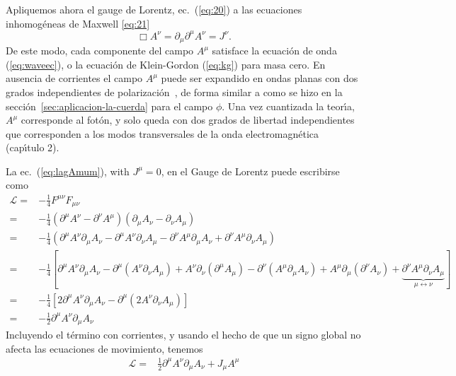 \begin{frame}
Apliquemos ahora el gauge de Lorentz, ec.~(\ref{eq:20}) a las
ecuaciones inhomog\'eneas de Maxwell \eqref{eq:21}
\begin{equation}
  \label{eq:22} 
  \Box A^\nu=\partial_\mu\partial^\mu A^\nu=J^\nu.
\end{equation}
De este modo, cada componente del campo $A^\mu$ satisface la ecuaci\'on de
onda (\ref{eq:waveec}), o la ecuaci\'on de Klein-Gordon (\ref{eq:kg})
para masa cero. En ausencia de corrientes el campo $A^\mu$ puede ser
expandido en ondas planas con dos grados independientes de
polarizaci\'on~\cite{Gross}, de forma similar a como se hizo en la
secci\'on~\ref{sec:aplicacion-la-cuerda} para el campo $\phi$. Una vez
cuantizada la teor\'\i a, $A^\mu$ corresponde al fot\'on, y solo queda con dos
grados de libertad independientes que corresponden a los modos
transversales de la onda electromagn\'etica~\cite{Gross} (cap\'\i tulo 2).

La ec.~(\ref{eq:lagAmum}), with $J^\mu=0$, en el Gauge de Lorentz puede escribirse como
\begin{align}
  \label{eq:laglorgauge}
  \mathcal{L}=&-\frac{1}{4}F^{\mu\nu}F_{\mu\nu}\nonumber\\
  =&-\frac{1}{4}(\partial^\mu A^\nu-\partial^\nu A^\mu)(\partial_\mu A_\nu-\partial_\nu A_\mu)\nonumber\\
  =&-\frac{1}{4}(\partial^\mu A^\nu\partial_\mu A_\nu-\partial^\mu A^\nu\partial_\nu A_\mu-\partial^\nu A^\mu\partial_\mu A_\nu+\partial^\nu A^\mu\partial_\nu A_\mu)\nonumber\\
  =&-\frac{1}{4}[\partial^\mu A^\nu\partial_\mu A_\nu-\partial^\mu(A^\nu\partial_\nu A_\mu)+A^\nu\partial_\nu(\partial^\mu A_\mu)-\partial^\nu(A^\mu\partial_\mu A_\nu)+A^\mu\partial_\mu(\partial^\nu A_\nu)+\underbrace{\partial^\nu A^\mu\partial_\nu A_\mu}_{\mu\leftrightarrow\nu}]\nonumber\\
  =&-\frac{1}{4}[2\partial^\mu A^\nu\partial_\mu A_\nu-\partial^\mu(2A^\nu\partial_\nu A_\mu)]\nonumber\\
  =&-\frac{1}{2}\partial^\mu A^\nu\partial_\mu A_\nu
\end{align}
Incluyendo el t\'ermino con corrientes, y usando el hecho de que un signo global no afecta las ecuaciones de movimiento, tenemos
\begin{align}
  \label{eq:laglorgauugefin}
  \mathcal{L}=&\frac{1}{2}\partial^\mu A^\nu\partial_\mu A_\nu+J_\mu A^\mu
\end{align}
\end{frame}
